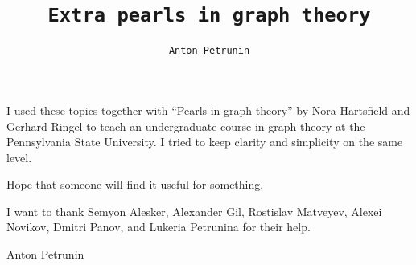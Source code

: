 \title{\tt Extra pearls in graph theory}
\author{\tt Anton Petrunin}
\date{}
\maketitle

I used these topics together with ``Pearls in graph theory'' by Nora Hartsfield and Gerhard Ringel \cite{hartsfield-ringel} to teach an undergraduate course in graph theory at the Pennsylvania State University.
I tried to keep clarity and simplicity on the same level.

Hope that someone will find it useful for something.

\medskip

I want to thank 
Semyon Alesker,
Alexander Gil,
Rostislav Matveyev,
Alexei Novikov,
Dmitri Panov,
and Lukeria Petrunina for their help.

\begin{flushright}
Anton Petrunin
\end{flushright}

{\sloppy

\null\vfill{}

}

\thispagestyle{empty}
\newpage
\tableofcontents
